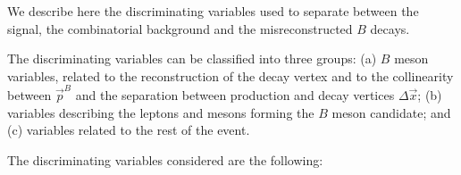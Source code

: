 We describe here the discriminating variables used to separate
between the signal, the combinatorial background and the misreconstructed
$B$ decays.

The discriminating variables can be classified into three groups:
(a) $B$ meson variables, related to the reconstruction of the decay vertex and
to the collinearity between $\vec{p}^B$ and the separation between
production and decay vertices $\Delta\vec{x}$;
(b) variables describing the leptons and mesons forming the $B$ meson candidate;
and (c) variables related to the rest of the event.

The discriminating variables considered are the following:



